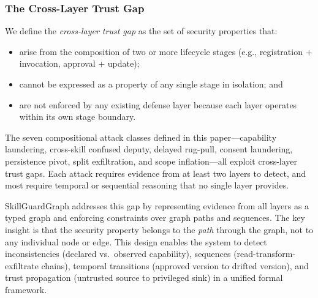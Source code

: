 \subsubsection{The Cross-Layer Trust Gap}

We define the \emph{cross-layer trust gap} as the set of security properties that:

\begin{itemize}
    \item arise from the composition of two or more lifecycle stages (e.g., registration + invocation, approval + update);
    \item cannot be expressed as a property of any single stage in isolation; and
    \item are not enforced by any existing defense layer because each layer operates within its own stage boundary.
\end{itemize}

The seven compositional attack classes defined in this paper---capability laundering, cross-skill confused deputy, delayed rug-pull, consent laundering, persistence pivot, split exfiltration, and scope inflation---all exploit cross-layer trust gaps. Each attack requires evidence from at least two layers to detect, and most require temporal or sequential reasoning that no single layer provides.

SkillGuardGraph addresses this gap by representing evidence from all layers as a typed graph and enforcing constraints over graph paths and sequences. The key insight is that the security property belongs to the \emph{path} through the graph, not to any individual node or edge. This design enables the system to detect inconsistencies (declared vs.\ observed capability), sequences (read-transform-exfiltrate chains), temporal transitions (approved version to drifted version), and trust propagation (untrusted source to privileged sink) in a unified formal framework.
